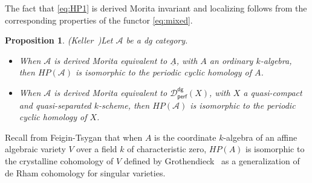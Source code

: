 \documentclass{amsart}
\numberwithin{equation}{subsection}
\newtheorem{proposition}[theorem]{Proposition}
\theoremstyle{remark}
\theoremstyle{remark}
\theoremstyle{remark}
\theoremstyle{remark}
\begin{document}
The fact that \eqref{eq:HP1} is derived Morita invariant and localizing follows from the corresponding properties of the functor \eqref{eq:mixed}.
\begin{proposition}{(Keller~\cite[Theorem~5.2]{ICM})}\label{prop:agreementHP}
Let ${{\mathcal A}}$ be a dg category.
\begin{itemize}
\item[(a)] When ${{\mathcal A}}$ is derived Morita equivalent to $\underline{A}$, with $A$ an ordinary $k$-algebra, then $HP({{\mathcal A}})$ is isomorphic to the periodic cyclic homology of $A$.
\item[(b)]  When ${{\mathcal A}}$ is derived Morita equivalent to ${{\mathcal D}}_{\mathsf{perf}}^{\mathsf{dg}}(X)$, with $X$ a quasi-compact and quasi-separated $k$-scheme, then $HP({{\mathcal A}})$ is isomorphic to the periodic cyclic homology of $X$.
\end{itemize}
\end{proposition}
Recall from Feigin-Tsygan \cite{FT} that when $A$ is the coordinate $k$-algebra of an affine algebraic variety $V$ over a field $k$ of characteristic zero, $HP(A)$ is isomorphic to the crystalline cohomology of $V$ defined by Grothendieck~\cite{Grot} as a generalization of de Rham cohomology for singular varieties.
\end{document}
